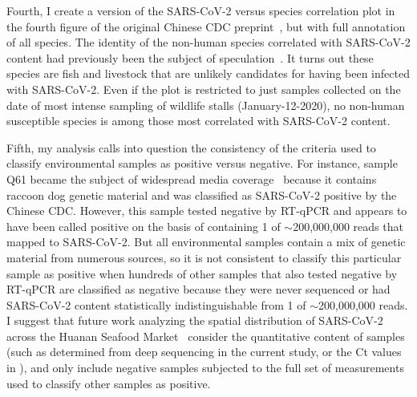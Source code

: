 \documentclass[9pt,twocolumn,twoside]{gsajnl_modified}
\begin{document}
Fourth, I create a version of the SARS-CoV-2 versus species correlation plot in the fourth figure of the original Chinese CDC preprint~\citep{liu2022surveillance}, but with full annotation of all species.
The identity of the non-human species correlated with SARS-CoV-2 content had previously been the subject of speculation~\citep{cohen2022anywhere, cohen2022studies, cohen2023unearthed}.
It turns out these species are fish and livestock that are unlikely candidates for having been infected with SARS-CoV-2.
Even if the plot is restricted to just samples collected on the date of most intense sampling of wildlife stalls (January-12-2020), no non-human susceptible species is among those most correlated with SARS-CoV-2 content. 

Fifth, my analysis calls into question the consistency of the criteria used to classify environmental samples as positive versus negative.
For instance, sample Q61 became the subject of widespread media coverage~\citep{wu2023atlantic, mueller2023nytimes} because it contains raccoon dog genetic material and was classified as SARS-CoV-2 positive by the Chinese CDC.
However, this sample tested negative by RT-qPCR and appears to have been called positive on the basis of containing 1 of $\sim$200,000,000 reads that mapped to SARS-CoV-2.
But all environmental samples contain a mix of genetic material from numerous sources, so it is not consistent to classify this particular sample as positive when hundreds of other samples that also tested negative by RT-qPCR are classified as negative because they were never sequenced or had SARS-CoV-2 content statistically indistinguishable from 1 of $\sim$200,000,000 reads.
I suggest that future work analyzing the spatial distribution of SARS-CoV-2 across the Huanan Seafood Market~\citep{worobey2022huanan,courtier2022sars,crits2023genetic} consider the quantitative content of samples (such as determined from deep sequencing in the current study, or the Ct values in \citet{liu2023surveillance}), and only include negative samples subjected to the full set of measurements used to classify other samples as positive.
\end{document}
